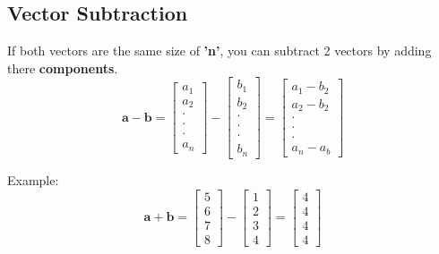 \documentclass[12pt]{article}
\begin{document}
        \subsection{Vector Subtraction}
            If both vectors are the same size of \textbf{'n'}, you can subtract 2 vectors by adding there \textbf{components}.
            \begin{equation}
                \mathbf{a - b} =
                    \begin{bmatrix} a_1 \\ a_2 \\ \cdot \\ \cdot \\ \cdot \\ a_n \end{bmatrix} -
                    \begin{bmatrix} b_1 \\ b_2 \\ \cdot \\ \cdot \\ \cdot \\ b_n \end{bmatrix} =
                    \begin{bmatrix} a_1 - b_2 \\ a_2 - b_2 \\ \cdot \\ \cdot \\ \cdot \\ a_n - a_b \end{bmatrix}
            \end{equation}

            Example:
            \begin{equation}
                \mathbf{a + b} =
                    \begin{bmatrix} 5 \\ 6 \\ 7 \\ 8 \end{bmatrix} -
                    \begin{bmatrix} 1 \\ 2 \\ 3 \\ 4 \end{bmatrix} =
                    \begin{bmatrix} 4 \\ 4 \\ 4 \\ 4 \end{bmatrix}
            \end{equation}
\end{document}
